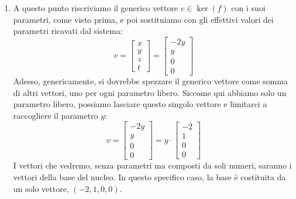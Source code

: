 \documentclass[12pt]{report}
\begin{document}
\begin{enumerate}
\[\begin{cases}
				7z = 0\\
				9t = 0
			\end{cases}
		\]
		Da cui ovviamente otteniamo che $z = 0, t = 0$. A questo punto rimane da sostituire nella prima equazione con i valori appena trovati, ottenendo:
		\[
		\begin{cases}
			x+2y = 0\\
			z = 0\\
			t = 0
		\end{cases}
		\]
		Possiamo fare una considerazione: il numero di righe nulle nella matrice a scala per riga indica il numero di variabili libere che avremo nel sistema: siccome avevamo una riga nulla, abbiamo una variabile libera, che per stavolta scegliamo essere y.
		Esplicitando y come variabile libera e scrivendo tutto in funzione di essa, otteniamo finalmente il seguente sistema risolto:
		\[
			\begin{cases}
				x = -2y\\
				y = y\\
				z = 0\\
				t = 0
			\end{cases}
		\]
		\item A questo punto riscriviamo il generico vettore $v \in \ker(f)$ con i suoi parametri, come visto prima, e poi sostituiamo con gli effettivi valori dei parametri ricavati dal sistema:
		\[
			v = 
			\begin{bmatrix}
				x\\
				y\\
				z\\
				t
			\end{bmatrix} = 
			\begin{bmatrix}
				-2y\\
				y\\
				0\\
				0
			\end{bmatrix}
		\]
		Adesso, genericamente, si dovrebbe spezzare il generico vettore come somma di altri vettori, uno per ogni parametro libero. Siccome qui abbiamo solo un parametro libero, possiamo lasciare questo singolo vettore e limitarci a raccogliere il parametro $y$:
		\[
			v = 
			\begin{bmatrix}
				-2y\\
				y\\
				0\\
				0
			\end{bmatrix} = 
			y \cdot 
			\begin{bmatrix}
				-2\\
				1\\
				0\\
				0
			\end{bmatrix}
		\]
		I vettori che vedremo, senza parametri ma composti da soli numeri, saranno i vettori della base del nucleo. In questo specifico caso, la base è costituita da un solo vettore, $(-2, 1, 0, 0)$.
		
	\end{enumerate}
	
\end{document}
